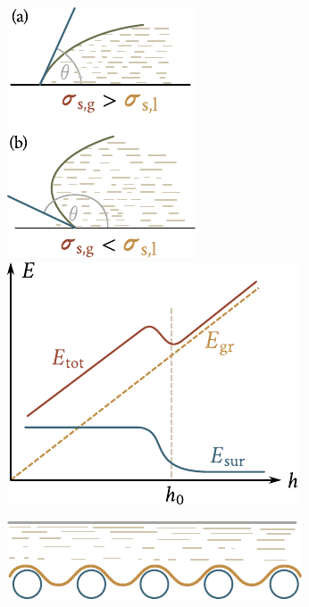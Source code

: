 \begin{figure}[t]
	\begin{minipage}[t]{0.5\linewidth}
		\begin{center}
			\includegraphics[scale=0.95]{figures/ch_14/fig_14_9.pdf}
			\caption[]{}
			\label{fig:14_9}
		\end{center}
	\end{minipage}
	\hspace{-0.05cm}
	\begin{minipage}[t]{0.5\linewidth}
		\begin{center}
			\includegraphics[scale=0.95]{figures/ch_14/fig_14_10.pdf}
			\caption[]{}
			\label{fig:14_10}
		\end{center}
	\end{minipage}
	\vspace{-0.3cm}
\end{figure}

\begin{figure}[t]
	\begin{center}
		\includegraphics[scale=0.95]{figures/ch_14/fig_14_11.pdf}
		\caption[]{}
		\label{fig:14_11}
	\end{center}
	\vspace{-0.9cm}
\end{figure}


